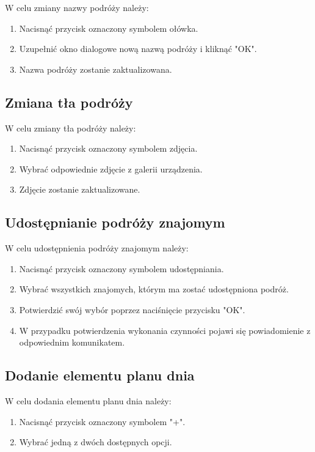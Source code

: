 \documentclass[10pt,twoside,a4paper]{report}
\begin{document}
W celu zmiany nazwy podróży należy:
\begin{enumerate}
\item Nacisnąć przycisk oznaczony symbolem ołówka.
\item Uzupełnić okno dialogowe nową nazwą podróży i kliknąć "OK".
\item Nazwa podróży zostanie zaktualizowana.
\end{enumerate}

\subsection{Zmiana tła podróży}

W celu zmiany tła podróży należy:
\begin{enumerate}
\item Nacisnąć przycisk oznaczony symbolem zdjęcia.
\item Wybrać odpowiednie zdjęcie z galerii urządzenia.
\item Zdjęcie zostanie zaktualizowane.
\end{enumerate}

\subsection{Udostępnianie podróży znajomym}

W celu udostępnienia podróży znajomym należy:
\begin{enumerate}
\item Nacisnąć przycisk oznaczony symbolem udostępniania.
\item Wybrać wszystkich znajomych, którym ma zostać udostępniona podróż.
\item Potwierdzić swój wybór poprzez naciśnięcie przycisku "OK".
\item W przypadku potwierdzenia wykonania czynności pojawi się powiadomienie z odpowiednim komunikatem.
\end{enumerate}

\subsection{Dodanie elementu planu dnia}
W celu dodania elementu planu dnia należy:
\begin{enumerate}
\item Nacisnąć przycisk oznaczony symbolem "+".
\item Wybrać jedną z dwóch dostępnych opcji.
\end{enumerate}
\end{document}
